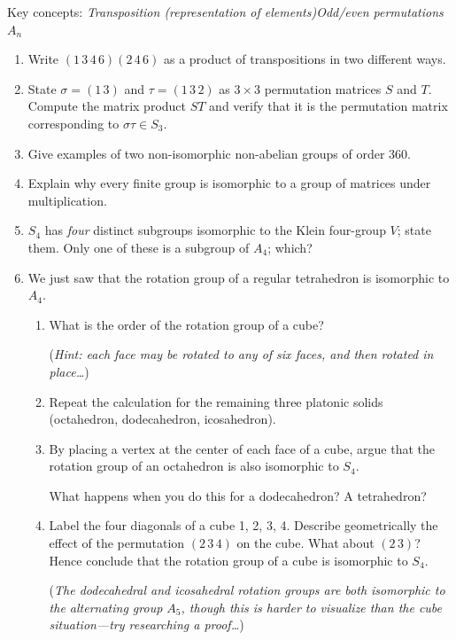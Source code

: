 \begin{exercises}
	Key concepts:\quad
		\emph{Transposition (representation of elements)\quad Odd/even permutations\quad $A_n$}
	
	\begin{enumerate}
	  \item Write $(1\,3\,4\,6)(2\,4\,6)$ as a product of transpositions in two different ways.
	  
	  
	  \item State $\sigma=(1\,3)$ and $\tau=(1\,3\,2)$ as $3\times 3$ permutation matrices $S$ and $T$. Compute the matrix product $ST$ and verify that it is the permutation matrix corresponding to $\sigma\tau\in S_3$.
	  
	  
	  \item Give examples of two non-isomorphic non-abelian groups of order 360.
	  
	  
	  \item Explain why every finite group is isomorphic to a group of matrices under multiplication.
	  
	  
	  \item $S_4$ has \emph{four} distinct subgroups isomorphic to the Klein four-group $V$; state them. Only one of these is a subgroup of $A_4$; which?
	  
	  
	  \item We just saw that the rotation group of a regular tetrahedron is isomorphic to $A_4$.
	  \begin{enumerate}
	    \item What is the order of the rotation group of a cube?\par
	    (\emph{Hint: each face may be rotated to any of six faces, and then rotated in place\ldots})
	    
	    \item Repeat the calculation for the remaining three platonic solids (octahedron, dodecahedron, icosahedron).
	    
	    \item By placing a vertex at the center of each face of a cube, argue that the rotation group of an octahedron is also isomorphic to $S_4$.\par
	    What happens when you do this for a dodecahedron? A tetrahedron?
	    
	    \item Label the four diagonals of a cube 1, 2, 3, 4. Describe geometrically the effect of the permutation $(2\,3\,4)$ on the cube. What about $(2\,3)$? Hence conclude that the rotation group of a cube is isomorphic to $S_4$.\par
	    (\emph{The dodecahedral and icosahedral rotation groups are both isomorphic to the alternating group $A_5$, though this is harder to visualize than the cube situation---try researching a proof\ldots})
	  \end{enumerate}
	  

\end{enumerate}
\end{exercises}
